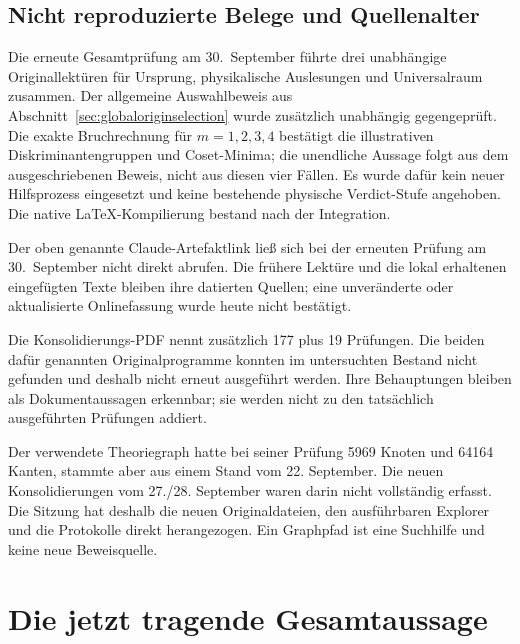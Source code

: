\subsection{Nicht reproduzierte Belege und Quellenalter}
Die erneute Gesamtprüfung am 30.~September führte drei unabhängige Originallektüren für Ursprung, physikalische Auslesungen und Universalraum zusammen. Der allgemeine Auswahlbeweis aus Abschnitt~\ref{sec:globaloriginselection} wurde zusätzlich unabhängig gegengeprüft. Die exakte Bruchrechnung für $m=1,2,3,4$ bestätigt die illustrativen Diskriminantengruppen und Coset-Minima; die unendliche Aussage folgt aus dem ausgeschriebenen Beweis, nicht aus diesen vier Fällen. Es wurde dafür kein neuer Hilfsprozess eingesetzt und keine bestehende physische Verdict-Stufe angehoben. Die native LaTeX-Kompilierung bestand nach der Integration.

Der oben genannte Claude-Artefaktlink ließ sich bei der erneuten Prüfung am 30.~September nicht direkt abrufen. Die frühere Lektüre und die lokal erhaltenen eingefügten Texte bleiben ihre datierten Quellen; eine unveränderte oder aktualisierte Onlinefassung wurde heute nicht bestätigt.

Die Konsolidierungs-PDF nennt zusätzlich 177 plus 19 Prüfungen. Die beiden dafür genannten Originalprogramme konnten im untersuchten Bestand nicht gefunden und deshalb nicht erneut ausgeführt werden. Ihre Behauptungen bleiben als Dokumentaussagen erkennbar; sie werden nicht zu den tatsächlich ausgeführten Prüfungen addiert.

Der verwendete Theoriegraph hatte bei seiner Prüfung 5969 Knoten und 64164 Kanten, stammte aber aus einem Stand vom 22. September. Die neuen Konsolidierungen vom 27./28. September waren darin nicht vollständig erfasst. Die Sitzung hat deshalb die neuen Originaldateien, den ausführbaren Explorer und die Protokolle direkt herangezogen. Ein Graphpfad ist eine Suchhilfe und keine neue Beweisquelle.

\section{Die jetzt tragende Gesamtaussage}


